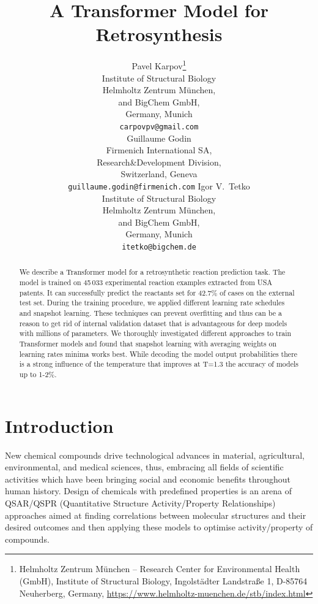 \documentclass{article}
\title{A Transformer Model for Retrosynthesis}
\author{
  Pavel Karpov\thanks{Helmholtz Zentrum M{\"u}nchen -- Research Center for Environmental Health (GmbH), Institute of Structural Biology, Ingolst{\"a}dter Landstra{\ss}e 1, D-85764 Neuherberg, Germany, \url{https://www.helmholtz-muenchen.de/stb/index.html}}\\
  Institute of Structural Biology\\
  Helmholtz Zentrum M{\"u}nchen,\\
  and BigChem GmbH, \\
  Germany, Munich \\
  \texttt{carpovpv@gmail.com} \\
   \And 
  Guillaume Godin\\
  Firmenich International SA,\\
  Research\&Development Division, \\
  Switzerland, Geneva \\
  \texttt{guillaume.godin@firmenich.com}
  \And
  Igor V.~Tetko \\
  Institute of Structural Biology\\
  Helmholtz Zentrum M{\"u}nchen,\\
  and BigChem GmbH, \\ 
  Germany, Munich \\ 
  \texttt{itetko@bigchem.de} \\
}
\begin{document}
\maketitle

\begin{abstract}
We describe a Transformer model for a retrosynthetic reaction prediction task. 
The model is trained on 45\,033 experimental reaction examples extracted 
from USA patents. It can successfully predict the reactants set for 
42.7\% of cases on the external test set. During the training procedure, we applied 
different learning rate schedules and snapshot learning. These techniques can prevent 
overfitting and thus can be a reason to get rid of internal validation dataset that 
is advantageous for deep models with millions of parameters. We thoroughly investigated different 
approaches to train Transformer models and found that snapshot learning with averaging weights on 
learning rates minima works best.  While decoding the model output probabilities there is a strong 
 influence of the temperature that improves at T=1.3 the accuracy of models up to 1-2\%. 
\end{abstract}


\section{Introduction}
New chemical compounds drive technological advances in material, agricultural, environmental, and medical sciences, thus, embracing all fields of scientific activities which have been bringing social and economic benefits throughout human history. Design of chemicals with predefined properties is an arena of QSAR/QSPR (Quantitative Structure Activity/Property Relationships) approaches aimed at finding correlations between molecular structures and their desired outcomes and then applying these models to optimise activity/property of compounds. 
\end{document}
